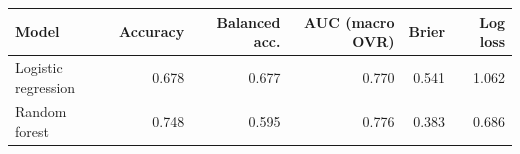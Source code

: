 \begin{tabular}{lrrrrr}
\toprule
Model & Accuracy & Balanced acc. & AUC (macro OVR) & Brier & Log loss \\
\midrule
Logistic regression & 0.678 & 0.677 & 0.770 & 0.541 & 1.062 \\
Random forest & 0.748 & 0.595 & 0.776 & 0.383 & 0.686 \\
\bottomrule
\end{tabular}
